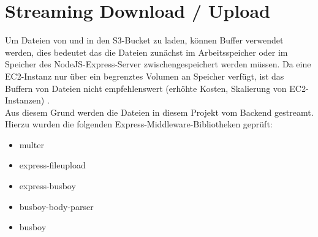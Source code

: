 \documentclass[a4paper, 12pt]{scrreprt}
\renewcommand\_{\textunderscore\allowbreak}
\begin{document}
\section{Streaming Download / Upload}

Um Dateien von und in den S3-Bucket zu laden, können Buffer verwendet werden, dies bedeutet das die Dateien zunächst im Arbeitsspeicher oder im Speicher des NodeJS-Express-Server zwischengespeichert werden müssen. Da eine EC2-Instanz nur über ein begrenztes Volumen an Speicher verfügt, ist das Buffern von Dateien nicht empfehlenswert (erhöhte Kosten, Skalierung von EC2-Instanzen) \cite{AWS}.\\
Aus diesem Grund werden die Dateien in diesem Projekt vom Backend gestreamt. Hierzu wurden die folgenden Express-Middleware-Bibliotheken geprüft:

\begin{itemize}
\item multer
\item express-fileupload
\item express-busboy
\item busboy-body-parser
\item busboy
\end{itemize}
\end{document}
